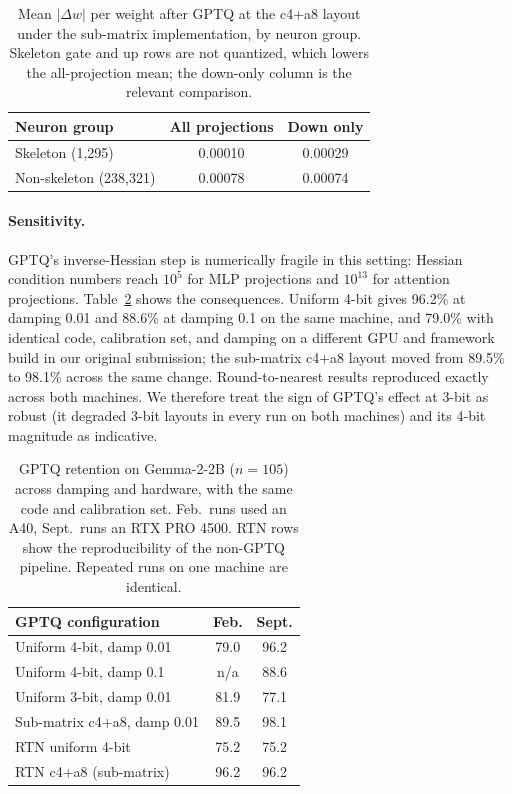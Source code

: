 \documentclass[11pt]{article}
\begin{document}
\begin{table}[t]
\centering
\small
\begin{tabular}{lcc}
\toprule
\textbf{Neuron group} & \textbf{All projections} & \textbf{Down only} \\
\midrule
Skeleton (1,295) & 0.00010 & 0.00029 \\
Non-skeleton (238,321) & 0.00078 & 0.00074 \\
\bottomrule
\end{tabular}
\caption{Mean $|\Delta w|$ per weight after GPTQ at the c4+a8 
layout under the sub-matrix implementation, by neuron group. 
Skeleton gate and up rows are not quantized, which lowers the 
all-projection mean; the down-only column is the relevant 
comparison.}
\label{tab:gptq_dw}
\end{table}

\paragraph{Sensitivity.}
GPTQ's inverse-Hessian step is numerically fragile in this 
setting: Hessian condition numbers reach $10^{5}$ for MLP 
projections and $10^{13}$ for attention projections. 
Table~\ref{tab:gptq_sens} shows the consequences. Uniform 4-bit 
gives 96.2\% at damping 0.01 and 88.6\% at damping 0.1 on the 
same machine, and 79.0\% with identical code, calibration set, 
and damping on a different GPU and framework build in our 
original submission; the sub-matrix c4+a8 layout moved from 
89.5\% to 98.1\% across the same change. Round-to-nearest 
results reproduced exactly across both machines. We therefore 
treat the sign of GPTQ's effect at 3-bit as robust (it 
degraded 3-bit layouts in every run on both machines) and its 
4-bit magnitude as indicative.

\begin{table}[t]
\centering
\small
\begin{tabular}{lcc}
\toprule
\textbf{GPTQ configuration} & \textbf{Feb.} & \textbf{Sept.} \\
\midrule
Uniform 4-bit, damp 0.01 & 79.0 & 96.2 \\
Uniform 4-bit, damp 0.1 & n/a & 88.6 \\
Uniform 3-bit, damp 0.01 & 81.9 & 77.1 \\
Sub-matrix c4+a8, damp 0.01 & 89.5 & 98.1 \\
\midrule
RTN uniform 4-bit & 75.2 & 75.2 \\
RTN c4+a8 (sub-matrix) & 96.2 & 96.2 \\
\bottomrule
\end{tabular}
\caption{GPTQ retention on Gemma-2-2B ($n{=}105$) across 
damping and hardware, with the same code and calibration set. 
Feb.\ runs used an A40, Sept.\ runs an RTX PRO 4500. RTN rows 
show the reproducibility of the non-GPTQ pipeline. Repeated 
runs on one machine are identical.}
\label{tab:gptq_sens}
\end{table}
\end{document}
